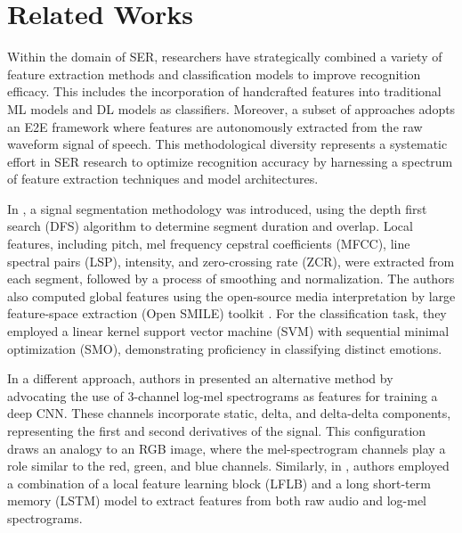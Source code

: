 \section{Related Works}
\label{related_works}

Within the domain of SER, researchers have strategically combined a variety of feature extraction methods and classification models to improve recognition efficacy. This includes the incorporation of handcrafted features into traditional ML models and DL models as classifiers. Moreover, a subset of approaches adopts an E2E framework where features are autonomously extracted from the raw waveform signal of speech. This methodological diversity represents a systematic effort in SER research to optimize recognition accuracy by harnessing a spectrum of feature extraction techniques and model architectures.

In \cite{gao2017speech}, a signal segmentation methodology was introduced, using the depth first search (DFS) algorithm to determine segment duration and overlap. Local features, including pitch, mel frequency cepstral coefficients (MFCC), line spectral pairs (LSP), intensity, and zero-crossing rate (ZCR), were extracted from each segment, followed by a process of smoothing and normalization. The authors also computed global features using the open-source media interpretation by large feature-space extraction (Open SMILE) toolkit \cite{eyben2016open}. For the classification task, they employed a linear kernel support vector machine (SVM) with sequential minimal optimization (SMO), demonstrating proficiency in classifying distinct emotions.

In a different approach, authors in \cite{zhang2017speech} presented an alternative method by advocating the use of 3-channel log-mel spectrograms as features for training a deep CNN. These channels incorporate static, delta, and delta-delta components, representing the first and second derivatives of the signal. This configuration draws an analogy to an RGB image, where the mel-spectrogram channels play a role similar to the red, green, and blue channels. Similarly, in \cite{zhao2019speech}, authors employed a combination of a local feature learning block (LFLB) and a long short-term memory (LSTM) model to extract features from both raw audio and log-mel spectrograms.


